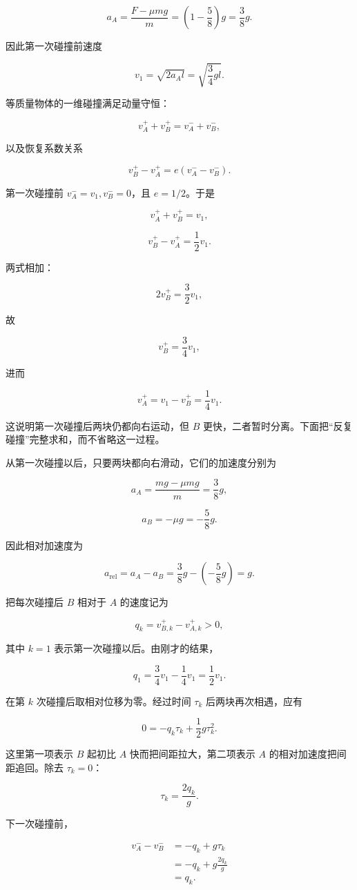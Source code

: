 \documentclass[12pt,a4paper,UTF8]{ctexart}
\begin{document}
\[a_A=\frac{F-\mu mg}{m}
=\left(1-\frac58\right)g
=\frac38g.\]

因此第一次碰撞前速度

\[v_1=\sqrt{2a_Al}
=\sqrt{\frac34gl}.\]

等质量物体的一维碰撞满足动量守恒：

\[v_A^++v_B^+=v_A^-+v_B^-,\]

以及恢复系数关系

\[v_B^+-v_A^+
=e(v_A^--v_B^-).\]

第一次碰撞前 \(v_A^-=v_1,v_B^-=0\)，且 \(e=1/2\)。于是

\[v_A^++v_B^+=v_1,\]

\[v_B^+-v_A^+=\frac12v_1.\]

两式相加：

\[2v_B^+=\frac32v_1,\]

故

\[v_B^+=\frac34v_1,\]

进而

\[v_A^+=v_1-v_B^+=\frac14v_1.\]

这说明第一次碰撞后两块仍都向右运动，但 \(B\)
更快，二者暂时分离。下面把``反复碰撞''完整求和，而不省略这一过程。

从第一次碰撞以后，只要两块都向右滑动，它们的加速度分别为

\[a_A=\frac{mg-\mu mg}{m}=\frac38g,\]

\[a_B=-\mu g=-\frac58g.\]

因此相对加速度为

\[a_{\mathrm{rel}}=a_A-a_B
=\frac38g-\left(-\frac58g\right)=g.\]

把每次碰撞后 \(B\) 相对于 \(A\) 的速度记为

\[q_k=v_{B,k}^+-v_{A,k}^+>0,\]

其中 \(k=1\) 表示第一次碰撞以后。由刚才的结果，

\[q_1=\frac34v_1-\frac14v_1=\frac12v_1.\]

在第 \(k\) 次碰撞后取相对位移为零。经过时间 \(\tau_k\)
后两块再次相遇，应有

\[0=-q_k\tau_k+\frac12g\tau_k^2.\]

这里第一项表示 \(B\) 起初比 \(A\) 快而把间距拉大，第二项表示 \(A\)
的相对加速度把间距追回。除去 \(\tau_k=0\)：

\[\boxed{\tau_k=\frac{2q_k}{g}}.\]

下一次碰撞前，

\[\begin{aligned}
v_A^--v_B^-
&=-q_k+g\tau_k\\
&=-q_k+g\frac{2q_k}{g}\\
&=q_k.
\end{aligned}\]
\end{document}
